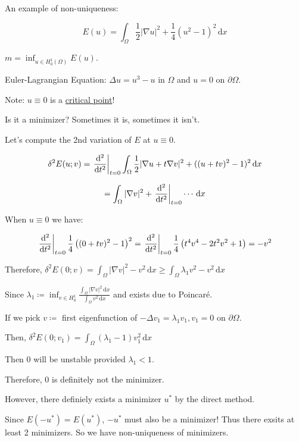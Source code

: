 \documentclass{article}
\theoremstyle{definition}
\begin{document}
An example of non-uniqueness:

\[
    E(u) = \int_{\Omega} \frac{1}{2} \vert \nabla u \vert ^ 2 + \frac{1}{4} (u^2 - 1)^2 \,\mathrm{d}x 
\]

\(m = \inf_{u \in H^1_0(\Omega)} E(u)\).

Euler-Lagrangian Equation: \(\Delta u = u^3 - u\) in \(\Omega\) and \(u = 0\) on \(\partial \Omega\).

Note: \(u \equiv 0\) is a \underline{critical point}!

Is it a minimizer? Sometimes it is, sometimes it isn't.

Let's compute the 2nd variation of \(E\) at \(u \equiv 0\).

\[
    \delta^2 E(u;v) = \eval{\frac{\mathrm{d}^2}{\mathrm{d}t^2}}_{t=0} \int_{\Omega} \frac{1}{2} \vert \nabla u + t \nabla v \vert ^ 2 + ((u+tv)^2 - 1)^2 \,\mathrm{d}x 
\]

\[
    = \int_{\Omega} \vert \nabla v \vert ^ 2 + \eval{\frac{\mathrm{d}^2}{\mathrm{d}t^2}}_{t=0} \cdots \,\mathrm{d}x 
\]

When \(u \equiv 0\) we have:

\[
    \eval{\frac{\mathrm{d}^2}{\mathrm{d}t^2}}_{t=0} \frac{1}{4} \left( (0+tv)^2 - 1 \right) ^ 2 = \eval{\frac{\mathrm{d}^2}{\mathrm{d}t^2}}_{t=0} \frac{1}{4} \left( t^4 v^4 - 2 t^2 v^2 + 1 \right)  = - v^2 
\]

Therefore, \(\delta^2 E(0;v) = \int_{\Omega} \vert \nabla v \vert ^2 - v^2 \,\mathrm{d}x \geq \int_{\Omega} \lambda_1 v^2 - v^2 \,\mathrm{d}x\)

Since \(\lambda_1 \coloneqq \inf_{v\in H^1_0} \frac{\int_{\Omega} \vert \nabla v \vert ^ 2 \,\mathrm{d}x }{\int_{\Omega} v^2 \,\mathrm{d}x}\) and exists due to Poincar\'e.

If we pick \(v\coloneqq\) first eigenfunction of \(-\Delta v_1 = \lambda_1 v_1, v_1 = 0\) on \(\partial \Omega\).

Then, \(\delta^2 E(0;v_1) = \int_{\Omega} (\lambda_1 - 1) v_1^2 \,\mathrm{d}x \) 

Then \(0\) will be unstable provided \(\lambda_1 < 1\).

Therefore, \(0\) is definitely not the minimizer.

However, there definiely exists a minimizer \(u^{\ast}\) by the direct method.

Since \(E(-u^{\ast}) = E(u^{\ast})\), \(-u^{\ast}\) must also be a minimizer! Thus there exsits at least 2 minimizers. So we have non-uniqueness of minimizers.
\end{document}
